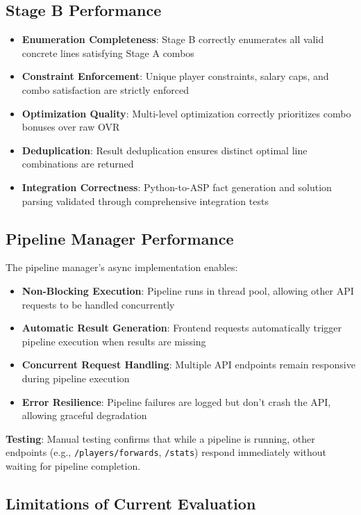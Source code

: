 \subsection{Stage B Performance}

\begin{itemize}
    \item \textbf{Enumeration Completeness}: Stage B correctly enumerates all valid concrete lines satisfying Stage A combos
    \item \textbf{Constraint Enforcement}: Unique player constraints, salary caps, and combo satisfaction are strictly enforced
    \item \textbf{Optimization Quality}: Multi-level optimization correctly prioritizes combo bonuses over raw OVR
    \item \textbf{Deduplication}: Result deduplication ensures distinct optimal line combinations are returned
    \item \textbf{Integration Correctness}: Python-to-ASP fact generation and solution parsing validated through comprehensive integration tests
\end{itemize}

\subsection{Pipeline Manager Performance}

The pipeline manager's async implementation enables:

\begin{itemize}
    \item \textbf{Non-Blocking Execution}: Pipeline runs in thread pool, allowing other API requests to be handled concurrently
    \item \textbf{Automatic Result Generation}: Frontend requests automatically trigger pipeline execution when results are missing
    \item \textbf{Concurrent Request Handling}: Multiple API endpoints remain responsive during pipeline execution
    \item \textbf{Error Resilience}: Pipeline failures are logged but don't crash the API, allowing graceful degradation
\end{itemize}

\textbf{Testing}: Manual testing confirms that while a pipeline is running, other endpoints (e.g., \texttt{/players/forwards}, \texttt{/stats}) respond immediately without waiting for pipeline completion.

\subsection{Limitations of Current Evaluation}

